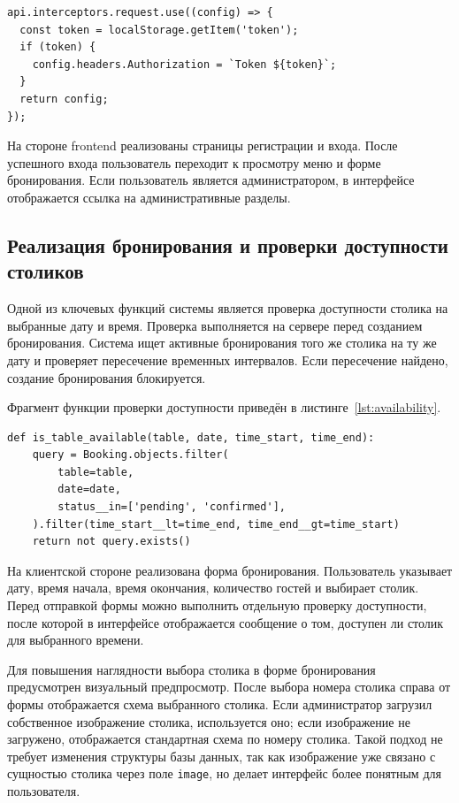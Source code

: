 \begin{lstlisting}[caption={Добавление токена авторизации к запросам}, label={lst:token_client}]
api.interceptors.request.use((config) => {
  const token = localStorage.getItem('token');
  if (token) {
    config.headers.Authorization = `Token ${token}`;
  }
  return config;
});
\end{lstlisting}

На стороне frontend реализованы страницы регистрации и входа. После успешного входа
пользователь переходит к просмотру меню и форме бронирования. Если пользователь
является администратором, в интерфейсе отображается ссылка на административные
разделы.

\subsection{Реализация бронирования и проверки доступности столиков}

Одной из ключевых функций системы является проверка доступности столика на выбранные
дату и время. Проверка выполняется на сервере перед созданием бронирования. Система
ищет активные бронирования того же столика на ту же дату и проверяет пересечение
временных интервалов. Если пересечение найдено, создание бронирования блокируется.

Фрагмент функции проверки доступности приведён в листинге~\ref{lst:availability}.

\begin{lstlisting}[caption={Проверка доступности столика}, label={lst:availability}]
def is_table_available(table, date, time_start, time_end):
    query = Booking.objects.filter(
        table=table,
        date=date,
        status__in=['pending', 'confirmed'],
    ).filter(time_start__lt=time_end, time_end__gt=time_start)
    return not query.exists()
\end{lstlisting}

На клиентской стороне реализована форма бронирования. Пользователь указывает дату,
время начала, время окончания, количество гостей и выбирает столик. Перед отправкой
формы можно выполнить отдельную проверку доступности, после которой в интерфейсе
отображается сообщение о том, доступен ли столик для выбранного времени.

Для повышения наглядности выбора столика в форме бронирования предусмотрен
визуальный предпросмотр. После выбора номера столика справа от формы отображается
схема выбранного столика. Если администратор загрузил собственное изображение
столика, используется оно; если изображение не загружено, отображается стандартная
схема по номеру столика. Такой подход не требует изменения структуры базы данных,
так как изображение уже связано с сущностью столика через поле \texttt{image}, но
делает интерфейс более понятным для пользователя.

